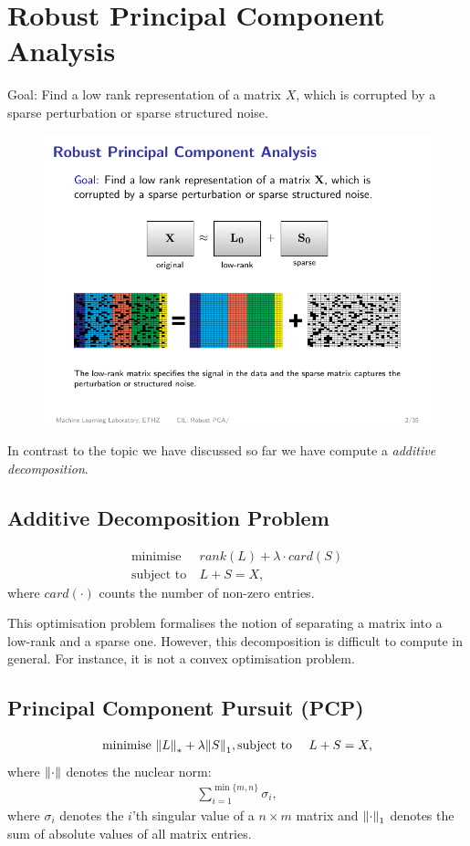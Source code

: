 \newpage
\section{Robust Principal Component Analysis}
Goal: Find a low rank representation of a matrix $X$, which is corrupted by a sparse perturbation or sparse structured noise.
\begin{figure}[H]
\centering
\includegraphics[width=.8\textwidth]{img/11_rpca}
\end{figure}
In contrast to the topic we have discussed so far we have compute a \emph{additive decomposition}.

\subsection{Additive Decomposition Problem}
\begin{align*}
     \text{minimise}\ &rank(L)+\lambda\cdot card(S)\\
     \text{subject to}\ &L+S =X,
\end{align*}
where $card(\cdot)$ counts the number of non-zero entries.

This optimisation problem formalises the notion of separating a matrix into a low-rank and a sparse one. However, this decomposition is difficult to compute in general. For instance, it is not a convex optimisation problem.

\subsection{Principal Component Pursuit (PCP)}
\begin{align*}
     \text{minimise}\ &\norm{L}_* +\lambda \norm{S}_1,
     \text{subject to}\ &L+S =X,
\end{align*}
where $\left\lVert\cdot\right\rVert$ denotes the nuclear norm:
\begin{align*}
    \sum_{i=1}^{\min\{m,n\}} \sigma_i,
\end{align*}
where $\sigma_i$ denotes the $i$'th singular value of a $n\times m$ matrix and $\left\lVert\cdot\right\rVert_1$ denotes the sum of absolute values of all matrix entries.

